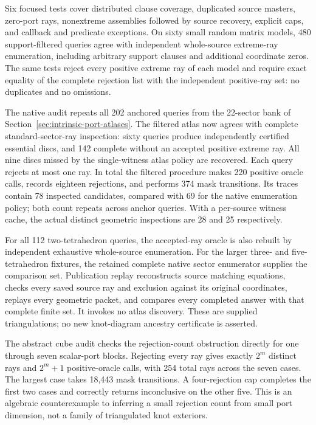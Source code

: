 Six focused tests cover distributed clause coverage, duplicated source
masters, zero-port rays, nonextreme assemblies followed by source
recovery, explicit caps, and callback and predicate exceptions.
On sixty small random matrix models, 480 support-filtered queries
agree with independent whole-source extreme-ray enumeration, including
arbitrary support clauses and additional coordinate zeros.  The same
tests reject every positive extreme ray of each model and require
exact equality of the complete rejection list with the independent
positive-ray set: no duplicates and no omissions.

The native audit repeats all 202 anchored queries from the 22-sector
bank of Section~\ref{sec:intrinsic-port-atlases}.  The filtered atlas
now agrees with complete standard-sector-ray inspection: sixty queries
produce independently certified essential discs, and 142 complete
without an accepted positive extreme ray.  All nine discs missed by
the single-witness atlas policy are recovered.  Each query rejects at
most one ray.  In total the filtered procedure makes 220 positive
oracle calls, records eighteen rejections, and performs 374 mask
transitions.  Its traces contain 78 inspected candidates, compared
with 69 for the native enumeration policy; both count repeats across
anchor queries.  With a per-source witness cache, the actual distinct
geometric inspections are 28 and 25 respectively.

For all 112 two-tetrahedron queries, the accepted-ray oracle is also
rebuilt by independent exhaustive whole-source enumeration.  For the
larger three- and five-tetrahedron fixtures, the retained complete native
sector enumerator supplies the comparison set.  Publication replay
reconstructs source matching equations, checks every saved source ray
and exclusion against its original coordinates, replays every geometric
packet, and compares every completed answer with that complete finite
set.  It invokes no atlas discovery.  These are supplied triangulations;
no new knot-diagram ancestry certificate is asserted.

The abstract cube audit checks the rejection-count obstruction directly
for one through seven scalar-port blocks.  Rejecting every ray gives
exactly $2^m$ distinct rays and $2^m+1$ positive-oracle calls, with 254
total rays across the seven cases.  The largest case takes 18,443 mask
transitions.  A four-rejection cap completes the first two cases and
correctly returns inconclusive on the other five.  This is an algebraic
counterexample to inferring a small rejection count from small port
dimension, not a family of triangulated knot exteriors.

